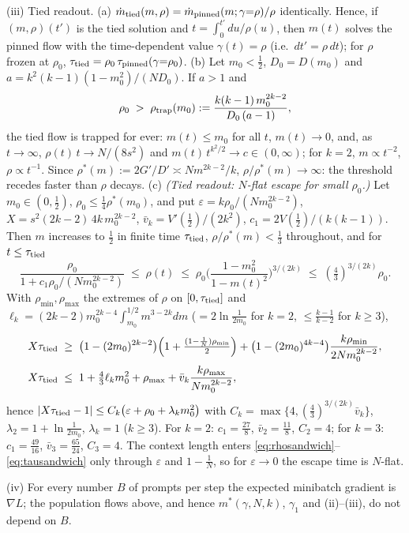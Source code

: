 \begin{theorem}[Finite-context trap; population flow, $\sg=\sg_k$, $k\ge2$]
\textup{(iii) Tied readout.} (a) $\dot m_{\rm tied}(m,\rho)=\dot m_{\rm pinned}(m;\gamma{=}\rho)/\rho$ identically. Hence, if $(m,\rho)(t')$ is the tied
solution and $t=\int_0^{t'}\!du/\rho(u)$, then $m(t)$ solves the pinned flow with the time-dependent value $\gamma(t)=\rho$ (i.e.\ $dt'=\rho\,dt$);
for $\rho$ frozen at $\rho_0$, $\tau_{\rm tied}=\rho_0\,\tau_{\rm pinned}(\gamma{=}\rho_0)$. (b) Let $m_0<\frac12$, $D_0=D(m_0)$ and
$a=k^2(k-1)(1-m_0^2)/(ND_0)$. If $a>1$ and
\begin{equation}\label{eq:trapcond}
\rho_0\;>\;\rho_{\rm trap}(m_0):=\frac{k(k-1)\,m_0^{2k-2}}{D_0\,(a-1)},
\end{equation}
the tied flow is trapped for ever: $m(t)\le m_0$ for all $t$, $m(t)\to0$, and, as $t\to\infty$, $\rho(t)\,t\to N/(8s^2)$ and $m(t)\,t^{k^2/2}\to c\in(0,\infty)$; for $k=2$,
$m\propto t^{-2}$, $\rho\propto t^{-1}$. Since $\rho^*(m):=2G'/D'\asymp Nm^{2k-2}/k$, $\rho/\rho^*(m)\to\infty$: the threshold recedes faster than $\rho$ decays.
(c) \emph{(Tied readout: $N$-flat escape for small $\rho_0$.)} Let $m_0\in(0,\frac12)$, $\rho_0\le\frac14\rho^*(m_0)$, and put
$\varepsilon=k\rho_0/(Nm_0^{2k-2})$, $X=s^2(2k-2)\,4k\,m_0^{2k-2}$, $\bar v_k=V'(\frac12)/(2k^2)$, $c_1=2V(\frac12)/(k(k-1))$. Then $m$ increases to $\frac12$ in finite
time $\tau_{\rm tied}$, $\rho/\rho^*(m)<\frac13$ throughout, and for $t\le\tau_{\rm tied}$
\begin{equation}\label{eq:rhosandwich}
\frac{\rho_0}{1+c_1\rho_0/(Nm_0^{2k-2})}\;\le\;\rho(t)\;\le\;\rho_0\Big(\frac{1-m_0^2}{1-m(t)^2}\Big)^{3/(2k)}\;\le\;(\tfrac43)^{3/(2k)}\rho_0 .
\end{equation}
With $\rho_{\min},\rho_{\max}$ the extremes of $\rho$ on $[0,\tau_{\rm tied}]$ and $\ell_k=(2k-2)m_0^{2k-4}\int_{m_0}^{1/2}m^{3-2k}dm$ ($=2\ln\frac1{2m_0}$ for $k=2$, $\le\frac{k-1}{k-2}$ for $k\ge3$),
\begin{equation}\label{eq:tausandwich}
\begin{aligned}
X\tau_{\rm tied}&\;\ge\;\big(1-(2m_0)^{2k-2}\big)\Big(1+\tfrac{(1-\frac1N)\rho_{\min}}2\Big)+\big(1-(2m_0)^{4k-4}\big)\frac{k\rho_{\min}}{2Nm_0^{2k-2}},\\
X\tau_{\rm tied}&\;\le\;1+\tfrac43\ell_km_0^2+\rho_{\max}+\bar v_k\frac{k\rho_{\max}}{Nm_0^{2k-2}},
\end{aligned}
\end{equation}
hence $|X\tau_{\rm tied}-1|\le C_k\big(\varepsilon+\rho_0+\lambda_km_0^2\big)$ with $C_k=\max\{4,(\frac43)^{3/(2k)}\bar v_k\}$, $\lambda_2=1+\ln\frac1{2m_0}$,
$\lambda_k=1$ ($k\ge3$). For $k=2$: $c_1=\frac{27}8$, $\bar v_2=\frac{11}8$, $C_2=4$; for $k=3$: $c_1=\frac{49}{16}$, $\bar v_3=\frac{65}{24}$, $C_3=4$. The context length enters
\eqref{eq:rhosandwich}--\eqref{eq:tausandwich} only through $\varepsilon$ and $1-\frac1N$, so for $\varepsilon\to0$ the escape time is $N$-flat.

\textup{(iv)} For every number $B$ of prompts per step the expected minibatch gradient is $\nabla L$; the population flows above, and hence
$m^*(\gamma,N,k)$, $\gamma_1$ and (ii)--(iii), do not depend on $B$.
\end{theorem}

